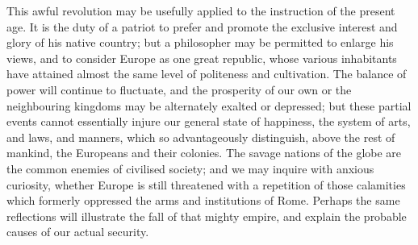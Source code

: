 This awful revolution may be usefully applied to the instruction of the present age. It is the duty of a patriot to prefer and promote the exclusive interest and glory of his native country; but a philosopher may be permitted to enlarge his views, and to consider Europe as one great republic, whose various inhabitants have attained almost the same level of politeness and cultivation. The balance of power will continue to fluctuate, and the prosperity of our own or the neighbouring kingdoms may be alternately exalted or depressed; but these partial events cannot essentially injure our general state of happiness, the system of arts, and laws, and manners, which so advantageously distinguish, above the rest of mankind, the Europeans and their colonies. The savage nations of the globe are the common enemies of civilised society; and we may inquire with anxious curiosity, whether Europe is still threatened with a repetition of those calamities which formerly oppressed the arms and institutions of Rome. Perhaps the same reflections will illustrate the fall of that mighty empire, and explain the probable causes of our actual security.

